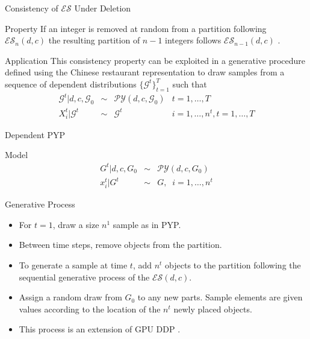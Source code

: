 \documentclass{beamer}
\newcommand{\G}{\mathcal{G}}
\newcommand{\PY}{\mathcal{P}\mathcal{Y}}
\newcommand{\ES}{\mathcal{E}\mathcal{S}}
\begin{document}
\begin{frame}[t]{Consistency of $\ES$ Under Deletion}
	\begin{block}{Property}
		If an integer is removed at random from a partition following $\ES_n(d,c)$ the resulting partition of $n-1$ integers follows $\ES_{n-1}(d,c)$  \cite{Pitman1995}.
	\end{block}
	
	\begin{block}{Application}
		This consistency property can be exploited in a generative procedure defined using the Chinese restaurant representation to draw samples from a sequence of dependent distributions $\{ \G^t \}_{t = 1}^T$ such that 
		\[
		\begin{array}{rcll}
			\G^t | d,c,\G_0 &\sim& \PY(d,c,\G_0)& t = 1, \ldots, T\\
			X_i^t | \G^t &\sim& \G^t& i = 1, \ldots, n^t, t = 1, \ldots, T
		\end{array}
		\]
	\end{block}
\end{frame}

\begin{frame}[t]{Dependent PYP}
	\begin{block}{Model}
		\vspace{-.5cm}
		\begin{eqnarray*}
			G^t | d,c, G_0 &\sim& \PY(d,c,G_0) \\
			x^t_i | G^t &\sim& G, \;\; i=1,\ldots,n^t
		\end{eqnarray*}
	\end{block}

	\begin{block}{Generative Process}
		\begin{itemize}
			\item For $t = 1$, draw a size  $n^1$ sample as in PYP.
			\item Between time steps, remove objects from the partition.
			\item To generate a sample at time $t$, add $n^t$ objects to the partition following the sequential generative process of the $\ES(d,c)$.
			\item Assign a random draw from $G_0$ to any new parts.  Sample elements are given values according to the location of the $n^t$ newly placed objects.
			\item This process is an extension of GPU DDP \cite{Caron2007}.
		\end{itemize}
	\end{block}
\end{frame}
\end{document}
